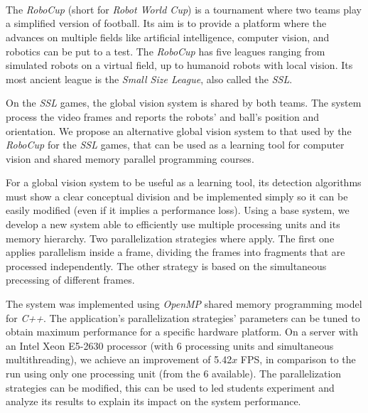 \ \\
\ \\
\label{pagsumm}
\\
\ \\
\ \\

\ \\

\ \\
\ \\

The \emph{RoboCup} (short for \emph{Robot World Cup}) is a tournament where two
teams play a simplified version of football. Its aim is to provide a platform
where the advances on multiple fields like artificial intelligence, computer
vision, and robotics can be put to a test. The \emph{RoboCup} has five leagues
ranging from simulated robots on a virtual field, up to humanoid robots with
local vision. Its most ancient league is the \emph{Small Size League}, also
called the \emph{SSL}.

On the \emph{SSL} games, the global vision system is shared by both teams. The
system process the video frames and reports the robots' and ball's position and
orientation. We propose an alternative global vision system to that used by the
\emph{RoboCup} for the \emph{SSL} games, that can be used as a learning tool for
computer vision and shared memory parallel programming courses.

For a global vision system to be useful as a learning tool, its detection
algorithms must show a clear conceptual division and be implemented simply so it
can be easily modified (even if it implies a performance loss). Using a base
system, we develop a new system able to efficiently use multiple processing
units and its memory hierarchy. Two parallelization strategies where apply.
The first one applies parallelism inside a frame, dividing the frames into
fragments that are processed independently. The other strategy is based on the
simultaneous precessing of different frames.

The system was implemented using \emph{OpenMP} shared memory programming model
for \emph{C++}. The application's parallelization strategies' parameters can be
tuned to obtain maximum performance for a specific hardware platform. On a
server with an Intel Xeon E5-2630 processor (with 6 processing units and
simultaneous multithreading), we achieve an improvement of 5.42$x$ FPS, in
comparison to the run using only one processing unit (from the 6 available). The
parallelization strategies can be modified, this can be used to led students
experiment and analyze its results to explain its impact on the system
performance.

\vfill
\pagebreak
